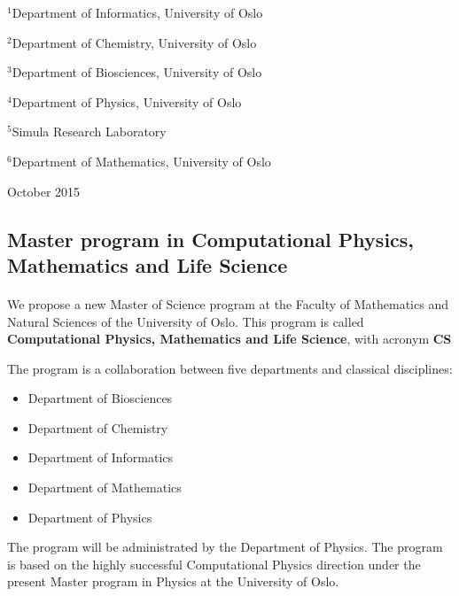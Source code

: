 \documentclass[%
oneside,                 %
final,                   %
10pt]{article}
\begin{document}
\begin{center}
\centerline{{\small ${}^1$Department of Informatics, University of Oslo}}
\centerline{{\small ${}^2$Department of Chemistry, University of Oslo}}
\centerline{{\small ${}^3$Department of Biosciences, University of Oslo}}
\centerline{{\small ${}^4$Department of Physics, University of Oslo}}
\centerline{{\small ${}^5$Simula Research Laboratory}}
\centerline{{\small ${}^6$Department of Mathematics, University of Oslo}}
\end{center}
    

\begin{center}
October 2015
\end{center}

\vspace{1cm}


\subsection*{Master program in Computational Physics, Mathematics and Life Science}

\paragraph{}
We propose a new Master of Science program at the Faculty of Mathematics and Natural Sciences of the University of Oslo. This program is called  \textbf{Computational Physics, Mathematics and Life Science}, with acronym  \textbf{CS}


The program is a collaboration between five departments and classical disciplines:

\begin{itemize}
 \item Department of Biosciences

 \item Department of Chemistry

 \item Department of Informatics

 \item Department of Mathematics

 \item Department of Physics
\end{itemize}

\noindent
The program will be administrated by the Department of Physics.
The program is based on the highly successful Computational Physics direction under the present Master program
in Physics at the University of Oslo.
\end{document}
